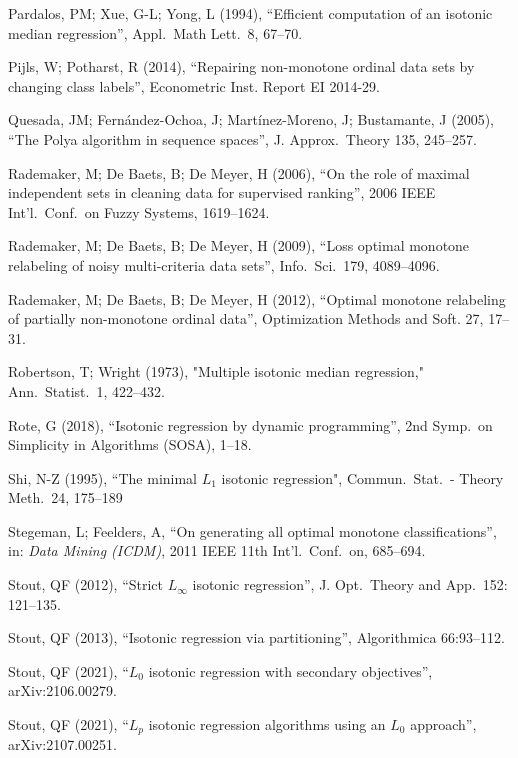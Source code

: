 \documentclass[11pt]{article}
\begin{document}
\begin{thebibliography}{99}
 Pardalos, PM; Xue, G-L; Yong, L (1994), ``Efficient computation of an isotonic median regression'',
Appl.\ Math Lett.\ 8, 67--70.

 Pijls, W; Potharst, R (2014), ``Repairing non-monotone ordinal data sets by changing class labels'', Econometric Inst. Report EI 2014-29.

 Quesada, JM; Fernández-Ochoa, J; Martínez-Moreno, J; Bustamante, J (2005), ``The Polya algorithm in sequence spaces'', J. Approx.\ Theory 135, 245--257. 

 Rademaker, M; De Baets, B; De Meyer, H (2006), ``On the role of maximal independent sets in cleaning data for supervised ranking'', 2006 IEEE Int'l.\ Conf.\ on Fuzzy Systems, 1619--1624.
  
 Rademaker, M; De Baets, B; De Meyer, H (2009), ``Loss optimal monotone relabeling of noisy multi-criteria data sets'', Info.\ Sci.\ 179, 4089--4096.

 Rademaker, M; De Baets, B; De Meyer, H (2012), ``Optimal monotone relabeling of partially non-monotone ordinal data'', Optimization Methods and Soft. 27, 17--31.

 Robertson, T; Wright (1973), "Multiple isotonic median regression," Ann.\ Statist.\ 1,
422--432.

 Rote, G (2018), ``Isotonic regression by dynamic programming'', 2nd Symp.\ on Simplicity in Algorithms (SOSA), 1--18.

 Shi, N-Z (1995), ``The minimal $L_1$ isotonic regression", Commun.\ Stat.\ - Theory Meth.\ 24, 175--189

 Stegeman, L; Feelders, A, ``On generating all optimal monotone classifications'', 
    in: \textit{Data Mining (ICDM)}, 2011 IEEE 11th Int'l.\ Conf.\ on, 685--694.

 Stout, QF (2012), ``Strict $L_\infty$ isotonic regression'', J. Opt.\ Theory and App.\ 152: 121--135.
 
 Stout, QF (2013), ``Isotonic regression via partitioning'', Algorithmica 66:93--112. 
 
 Stout, QF (2021),  “$L_0$ isotonic regression with secondary objectives”, arXiv:2106.00279.

  Stout, QF (2021), ``$L_p$ isotonic regression algorithms using an $L_0$ approach'', arXiv:2107.00251.


\end{thebibliography}
\end{document}
